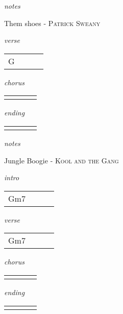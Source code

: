 \documentclass[12pt]{article}
\begin{document}
\textit{notes}

\newpage

{\Huge Them shoes} {\huge - \textsc{Patrick Sweany}}

\huge
\textit{verse}

\begin{tabular}{|P{1.25in}|P{1.25in}|P{1.25in}|P{1.25in}|}
  G  &   &   &   \\
\end{tabular}

\textit{chorus}

\begin{tabular}{|P{1.25in}|P{1.25in}|P{1.25in}|P{1.25in}|}
    &   &   &   \\
\end{tabular}

\textit{ending}

\begin{tabular}{|P{1.25in}|P{1.25in}|P{1.25in}|P{1.25in}|}
    &   &   &   \\
\end{tabular}

\textit{notes}

\newpage


{\Huge Jungle Boogie} {\huge - \textsc{Kool and the Gang}}

\huge
\textit{intro}

\begin{tabular}{|P{1.25in}|P{1.25in}|P{1.25in}|P{1.25in}|}
  Gm7 &   &   &   \\
\end{tabular}

\textit{verse}

\begin{tabular}{|P{1.25in}|P{1.25in}|P{1.25in}|P{1.25in}|}
  Gm7 &   &   &   \\
\end{tabular}

\textit{chorus}

\begin{tabular}{|P{1.25in}|P{1.25in}|P{1.25in}|P{1.25in}|}
    &   &   &   \\
\end{tabular}

\textit{ending}

\begin{tabular}{|P{1.25in}|P{1.25in}|P{1.25in}|P{1.25in}|}
    &   &   &   \\
\end{tabular}
\end{document}
